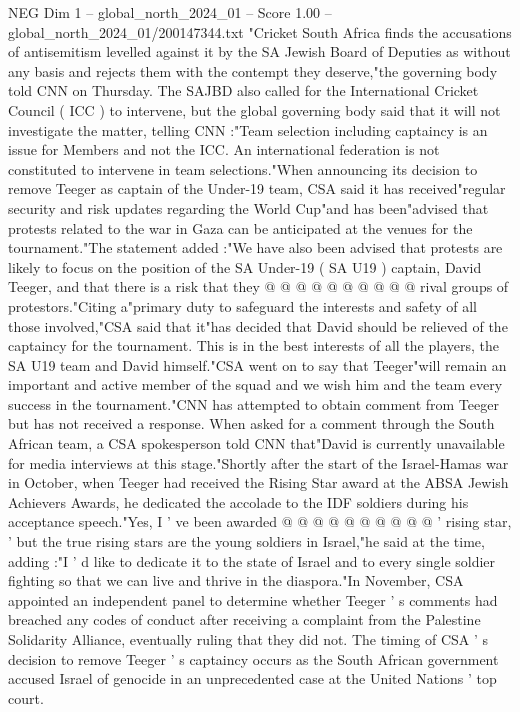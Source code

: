 \begin{textsample}{NEG Dim 1 – global\_north\_2024\_01 – Score 1.00 – global\_north\_2024\_01/200147344.txt}  \label{ex:f1_neg_296}
"Cricket South Africa finds the accusations of antisemitism levelled against it by the SA Jewish Board of Deputies as without any basis and rejects them with the contempt they deserve,"the governing body told CNN on Thursday.
The SAJBD also called for the International Cricket Council ( ICC ) to intervene, but the global governing body said that it will not investigate the matter, telling CNN :"Team selection including captaincy is an issue for Members and not the ICC.
An international federation is not constituted to intervene in team selections."When announcing its decision to remove Teeger as captain of the Under-19 team, CSA said it has received"regular security and risk updates regarding the World Cup"and has been"advised that protests related to the war in Gaza can be anticipated at the venues for the tournament."The statement added :"We have also been advised that protests are likely to focus on the position of the SA Under-19 ( SA U19 ) captain, David Teeger, and that there is a risk that they @ @ @ @ @ @ @ @ @ @ rival groups of protestors."Citing a"primary duty to safeguard the interests and safety of all those involved,"CSA said that it"has decided that David should be relieved of the captaincy for the tournament.
This is in the best interests of all the players, the SA U19 team and David himself."CSA went on to say that Teeger"will remain an important and active member of the squad and we wish him and the team every success in the tournament."CNN has attempted to obtain comment from Teeger but has not received a response.
When asked for a comment through the South African team, a CSA spokesperson told CNN that"David is currently unavailable for media interviews at this stage."Shortly after the start of the Israel-Hamas war in October, when Teeger had received the Rising Star award at the ABSA Jewish Achievers Awards, he dedicated the accolade to the IDF soldiers during his acceptance speech."Yes, I ' ve been awarded @ @ @ @ @ @ @ @ @ @ ' rising star, ' but the true rising stars are the young soldiers in Israel,"he said at the time, adding :"I ' d like to dedicate it to the state of Israel and to every single soldier fighting so that we can live and thrive in the diaspora."In November, CSA appointed an independent panel to determine whether Teeger ' s comments had breached any codes of conduct after receiving a complaint from the Palestine Solidarity Alliance, eventually ruling that they did not.
The timing of CSA ' s decision to remove Teeger ' s captaincy occurs as the South African government accused Israel of genocide in an unprecedented case at the United Nations ' top court.

\end{textsample}
